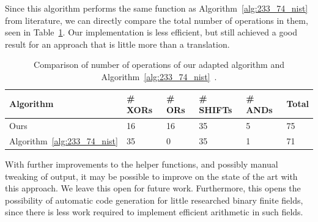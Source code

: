 Since this algorithm performs the same function as Algorithm~\ref{alg:233_74_nist} from literature, we can directly compare the total number of operations in them, seen in Table~\ref{table:comparison:nist}. Our implementation is less efficient, but still achieved a good result for an approach that is little more than a translation. \\

\begin{table}
\centering
\caption{Comparison of number of operations of our adapted algorithm and Algorithm~\ref{alg:233_74_nist}~\cite[p. 55]{hankerson2006guide}.}
{\begin{tabular}{l l l l l l} \label{table:comparison:nist}
Algorithm & \# XORs & \# ORs & \# SHIFTs & \# ANDs & Total \\ \hline
Ours & 16 & 16 & 35 & 5 & 75 \\ \hline
Algorithm~\ref{alg:233_74_nist} & 35 & 0 & 35 & 1 & 71
\end{tabular}}{}
\end{table}

With further improvements to the helper functions, and possibly manual tweaking of output, it may be possible to improve on the state of the art with this approach. We leave this open for future work. Furthermore, this opens the possibility of automatic code generation for little researched binary finite fields, since there is less work required to implement efficient arithmetic in such fields.